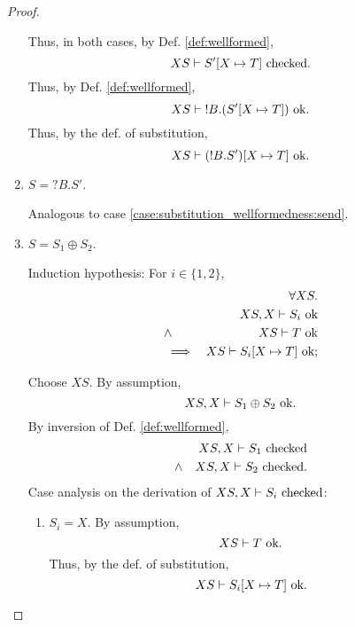 \documentclass{llncs}
\newcommand*{\recv}{\mathord{?}}
\newcommand*{\echoice}{\oplus}
\newcommand*{\envimpl}       [2]{#1 \vdash #2}
\newcommand*{\envimplchecked}[2]{\envimpl{#1}{\text{$#2$ {\normalfont \rmfamily checked}}}}
\newcommand*{\envimplok}     [2]{\envimpl{#1}{\text{$#2$ {\normalfont \rmfamily ok}}}}
\renewcommand*{\|}{\;|\;}
\begin{document}
\begin{proof}
\begin{enumerate}
      Thus, in both cases, by Def. \ref{def:wellformed},
      \begin{equation*}
        \envimplchecked{XS}{S'[X \mapsto T]}.
      \end{equation*}
      Thus, by Def. \ref{def:wellformed},
      \begin{equation*}
        \envimplok{XS}{!B.(S'[X \mapsto T])}.
      \end{equation*}
      Thus, by the def. of substitution,
      \begin{equation*}
        \envimplok{XS}{(!B.S')[X \mapsto T]}.
      \end{equation*}

    \item
      \label{case:substitution_wellformedness:recv}
      $S = \recv B.S'$.

      Analogous to case \ref{case:substitution_wellformedness:send}.

    \item
      \label{case:substitution_wellformedness:echoice}
      $S = S_1 \echoice S_2$.

      Induction hypothesis: For $i \in \{1, 2\}$,
      \begin{eqnarray*}
        &&         \forall XS. \\
        &&         \envimplok{XS, X}{S_i} \\
        &\land&    \envimplok{XS}{T} \\
        &\implies& \envimplok{XS}{S_i[X \mapsto T]};
      \end{eqnarray*}

      Choose $XS$. By assumption,
      \begin{equation*}
        \envimplok{XS, X}{S_1 \echoice S_2}.
      \end{equation*}
      By inversion of Def. \ref{def:wellformed},
      \begin{eqnarray*}
        &&      \envimplchecked{XS, X}{S_1} \\
        &\land& \envimplchecked{XS, X}{S_2}.
      \end{eqnarray*}
      Case analysis on the derivation of $\envimplchecked{XS, X}{S_i}$:
      \begin{enumerate}
        \item $S_i = X$.
          By assumption,
          \begin{equation*}
            \envimplok{XS}{T}.
          \end{equation*}
          Thus, by the def. of substitution,
          \begin{equation*}
            \envimplok{XS}{S_i[X \mapsto T]}.
          \end{equation*}


\end{enumerate}
\end{enumerate}
\end{proof}
\end{document}
